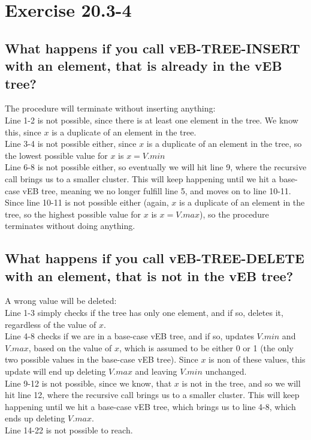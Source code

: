 \section*{Exercise 20.3-4}
\subsection*{What happens if you call vEB-TREE-INSERT with an element, that is already in the vEB tree?}

The procedure will terminate without inserting anything:
\\
Line 1-2 is not possible, since there is at least one element in the tree. We know this, since $x$ is a duplicate of an element in the tree.
\\
Line 3-4 is not possible either, since $x$ is a duplicate of an element in the tree, so the lowest possible value for $x$ is $x=V.min$
\\
Line 6-8 is not possible either, so eventually we will hit line 9, where the recursive call brings us to a smaller cluster. This will keep happening until we hit a base-case vEB tree, meaning we no longer fulfill line 5, and moves on to line 10-11.
\\
Since line 10-11 is not possible either (again, $x$ is a duplicate of an element in the tree, so the highest possible value for $x$ is $x=V.max$), so the procedure terminates without doing anything.

\subsection*{What happens if you call vEB-TREE-DELETE with an element, that is not in the vEB tree?}

A wrong value will be deleted:
\\
Line 1-3 simply checks if the tree has only one element, and if so, deletes it, regardless of the value of $x$.
\\
Line 4-8 checks if we are in a base-case vEB tree, and if so, updates $V.min$ and $V.max$, based on the value of $x$, which is assumed to be either 0 or 1 (the only two possible values in the base-case vEB tree). Since $x$ is non of these values, this update will end up deleting $V.max$ and leaving $V.min$ unchanged.
\\
Line 9-12 is not possible, since we know, that $x$ is not in the tree, and so we will hit line 12, where the recursive call brings us to a smaller cluster. This will keep happening until we hit a base-case vEB tree, which brings us to line 4-8, which ends up deleting $V.max.$
\\
Line 14-22 is not possible to reach.

